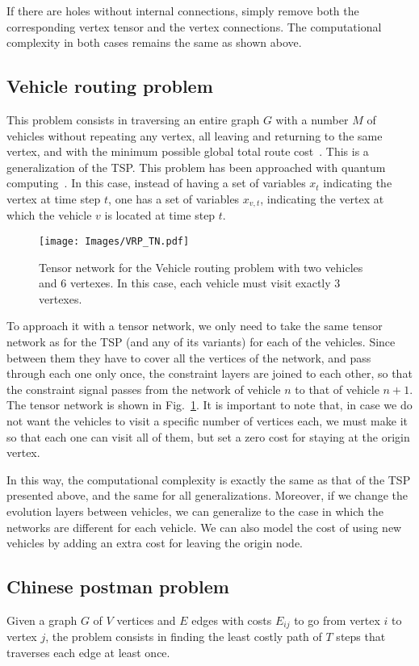 If there are holes without internal connections, simply remove both the corresponding vertex tensor and the vertex connections. The computational complexity in both cases remains the same as shown above.

\subsection{Vehicle routing problem}
This problem consists in traversing an entire graph $G$ with a number $M$ of vehicles without repeating any vertex, all leaving and returning to the same vertex, and with the minimum possible global total route cost~\cite{VRP}. This is a generalization of the TSP. This problem has been approached with quantum computing~\cite{VRP_Quantum}. In this case, instead of having a set of variables $x_t$ indicating the vertex at time step $t$, one has a set of variables $x_{v,t}$, indicating the vertex at which the vehicle $v$ is located at time step $t$.

\begin{figure}[h]
    \centering
    \texttt{[image: Images/VRP\_TN.pdf]}
    \caption{Tensor network for the Vehicle routing problem with two vehicles and 6 vertexes. In this case, each vehicle must visit exactly 3 vertexes.}
    \label{fig: VRP TN}
\end{figure}

To approach it with a tensor network, we only need to take the same tensor network as for the TSP (and any of its variants) for each of the vehicles. Since between them they have to cover all the vertices of the network, and pass through each one only once, the constraint layers are joined to each other, so that the constraint signal passes from the network of vehicle $n$ to that of vehicle $n+1$. The tensor network is shown in Fig.~\ref{fig: VRP TN}. It is important to note that, in case we do not want the vehicles to visit a specific number of vertices each, we must make it so that each one can visit all of them, but set a zero cost for staying at the origin vertex.

In this way, the computational complexity is exactly the same as that of the TSP presented above, and the same for all generalizations. Moreover, if we change the evolution layers between vehicles, we can generalize to the case in which the networks are different for each vehicle. We can also model the cost of using new vehicles by adding an extra cost for leaving the origin node.


\subsection{Chinese postman problem}
Given a graph $G$ of $V$ vertices and $E$ edges with costs $E_{ij}$ to go from vertex $i$ to vertex $j$, the problem consists in finding the least costly path of $T$ steps that traverses each edge at least once.

